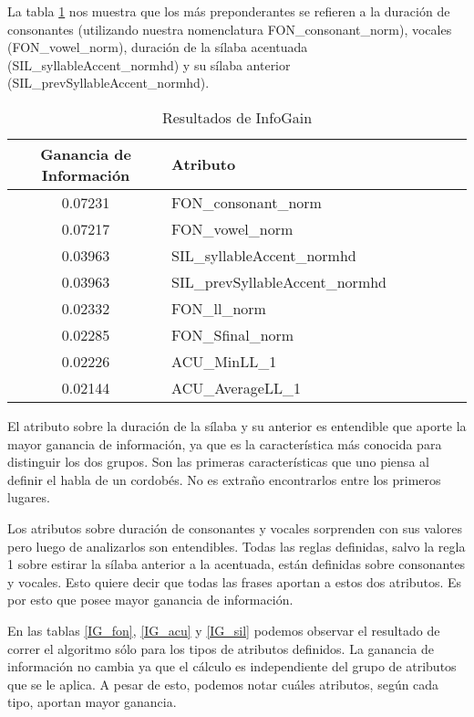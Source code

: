 La tabla \ref{infogain-table} nos muestra que los más preponderantes se refieren a la duración de consonantes (utilizando nuestra nomenclatura FON\_consonant\_norm), vocales (FON\_vowel\_norm), duración de la sílaba acentuada (SIL\_syllableAccent\_\-normhd) y su sílaba anterior \\ (SIL\_prevSyllableAccent\_normhd). 

\begin{table}[H]
\centering
\begin{tabular}{|c|l|c|c|c|c|c|}
\hline
\textbf{Ganancia de Información} & \textbf{Atributo} \\ \hline
 0.07231     & FON\_consonant\_norm \\ \hline
 0.07217     & FON\_vowel\_norm \\ \hline
 0.03963     & SIL\_syllableAccent\_normhd \\ \hline
 0.03963     & SIL\_prevSyllableAccent\_normhd \\ \hline
 0.02332     & FON\_ll\_norm \\ \hline
 0.02285     & FON\_Sfinal\_norm \\ \hline
 0.02226     & ACU\_MinLL\_1 \\ \hline
 0.02144     & ACU\_AverageLL\_1 \\ \hline
\end{tabular}
\caption{Resultados de InfoGain}
\label{infogain-table}
\end{table}

El atributo sobre la duración de la sílaba y su anterior es entendible que aporte la mayor ganancia de información, ya que es la característica más conocida para distinguir los dos grupos. Son las primeras características que uno piensa al definir el habla de un cordobés. No es extraño encontrarlos entre los primeros lugares. 

Los atributos sobre duración de consonantes y vocales sorprenden con sus valores pero luego de analizarlos son entendibles. Todas las reglas definidas, salvo la regla 1 sobre estirar la sílaba anterior a la acentuada, están definidas sobre consonantes y vocales. Esto quiere decir que todas las frases aportan a estos dos atributos. Es por esto que posee mayor ganancia de información.

En las tablas \ref{IG_fon}, \ref{IG_acu} y \ref{IG_sil} podemos observar el resultado de correr el algoritmo sólo para los tipos de atributos definidos. La ganancia de información no cambia ya que el cálculo es independiente del grupo de atributos que se le aplica. A pesar de esto, podemos notar cuáles atributos, según cada tipo, aportan mayor ganancia. 

